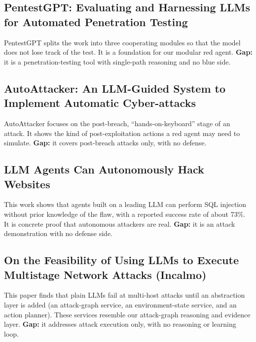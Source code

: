 \subsection{PentestGPT: Evaluating and Harnessing LLMs for Automated Penetration Testing}
PentestGPT splits the work into three cooperating modules so that the model does
not lose track of the test. It is a foundation for our modular red agent.
\textbf{Gap:} it is a penetration-testing tool with single-path reasoning and no
blue side.

\subsection{AutoAttacker: An LLM-Guided System to Implement Automatic Cyber-attacks}
AutoAttacker focuses on the post-breach, ``hands-on-keyboard'' stage of an
attack. It shows the kind of post-exploitation actions a red agent may need to
simulate. \textbf{Gap:} it covers post-breach attacks only, with no defense.

\subsection{LLM Agents Can Autonomously Hack Websites}
This work shows that agents built on a leading LLM can perform SQL injection
without prior knowledge of the flaw, with a reported success rate of about 73\%.
It is concrete proof that autonomous attackers are real. \textbf{Gap:} it is an
attack demonstration with no defense side.

\subsection{On the Feasibility of Using LLMs to Execute Multistage Network Attacks (Incalmo)}
This paper finds that plain LLMs fail at multi-host attacks until an abstraction
layer is added (an attack-graph service, an environment-state service, and an
action planner). These services resemble our attack-graph reasoning and evidence
layer. \textbf{Gap:} it addresses attack execution only, with no reasoning or
learning loop.

